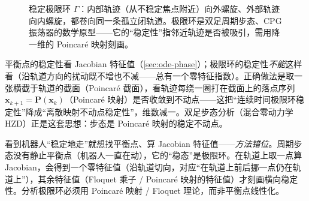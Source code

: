 \begin{figure}[ht]
\centering
{}
\caption{稳定极限环 $\Gamma$：内部轨迹（从不稳定焦点附近）向外螺旋、外部轨迹向内螺旋，都卷向同一条孤立闭轨道。极限环是双足周期步态、CPG 振荡器的数学原型——它的“稳定性”指邻近轨迹是否被吸引，需用降一维的 Poincaré 映射刻画。}
\label{fig:ode-limit-cycle}
\end{figure}

\begin{insight}
平衡点的稳定性看 Jacobian 特征值（\cref{sec:ode-phase}）；极限环的稳定性\emph{不能}这样看（沿轨道方向的扰动既不增也不减——总有一个零特征指数）。正确做法是取一张横截于轨道的截面（Poincaré 截面），看轨迹每绕一圈打在截面上的落点序列 $\mathbf{x}_{k+1}=\mathbf{P}(\mathbf{x}_k)$（Poincaré 映射）是否收敛到不动点——这把“连续时间极限环稳定性”降成“离散映射不动点稳定性”，维数减一。双足步态分析（混合零动力学 HZD）正是这套思想：步态是 Poincaré 映射的稳定不动点。
\end{insight}

\begin{pitfall}
看到机器人“稳定地走”就想找平衡点、算 Jacobian 特征值——\emph{方法错位}。周期步态没有静止平衡点（机器人一直在动），它的“稳态”是极限环。在轨道上取一点算 Jacobian，会得到一个零特征值（沿轨道切向，对应“在轨道上前后挪一点仍在轨道上”），其余特征值（Floquet 乘子 / Poincaré 映射的特征值）才刻画横向稳定性。分析极限环必须用 Poincaré 映射 / Floquet 理论，而非平衡点线性化。
\end{pitfall}

